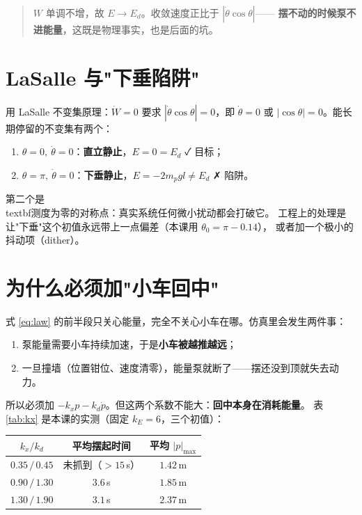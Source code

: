 \begin{quote}
$W$ 单调不增，故 $E\to E_d$。收敛速度正比于 $|\dot\theta\cos\theta|$——
\textbf{摆不动的时候泵不进能量}，这既是物理事实，也是后面的坑。
\end{quote}

\section{LaSalle 与"下垂陷阱"}

用 LaSalle 不变集原理：$\dot W=0$ 要求 $|\dot\theta\cos\theta|=0$，即
$\dot\theta=0$ 或 $|\cos\theta|=0$。能长期停留的不变集有两个：

\begin{enumerate}[leftmargin=2em,itemsep=2pt]
  \item $\theta=0,\ \dot\theta=0$：\textbf{直立静止}，$E=0=E_d$ ✓ 目标；
  \item $\theta=\pi,\ \dot\theta=0$：\textbf{下垂静止}，$E=-2m_pgl\ne E_d$ ✗ 陷阱。
\end{enumerate}

第二个是\\textbf{测度为零的对称点}：真实系统任何微小扰动都会打破它。
工程上的处理是让"下垂"这个初值永远带上一点偏差（本课用 $\theta_0=\pi-0.14$），
或者加一个极小的抖动项（dither）。

\section{为什么必须加"小车回中"}

式 \eqref{eq:law} 的前半段只关心能量，完全不关心小车在哪。仿真里会发生两件事：

\begin{enumerate}[leftmargin=2em,itemsep=2pt]
  \item 泵能量需要小车持续加速，于是\textbf{小车被越推越远}；
  \item 一旦撞墙（位置钳位、速度清零），能量泵就断了——摆还没到顶就失去动力。
\end{enumerate}

所以必须加 $-k_xp-k_d\dot p$。但这两个系数不能大：\textbf{回中本身在消耗能量}。
表 \ref{tab:kx} 是本课的实测（固定 $k_E=6$，三个初值）：

\begin{center}
\small
\begin{tabular}{@{}ccc@{}}
\toprule
$k_x/k_d$ & 平均摆起时间 & 平均 $|p|_{\max}$ \\
\midrule
$0.35\,/\,0.45$ & 未抓到（$>15$\,s） & $1.42$\,m \\
$0.90\,/\,1.30$ & $3.6$\,s & $1.85$\,m \\
$1.30\,/\,1.90$ & $3.1$\,s & $2.37$\,m \\
\bottomrule
\end{tabular}
\label{tab:kx}
\end{center}

